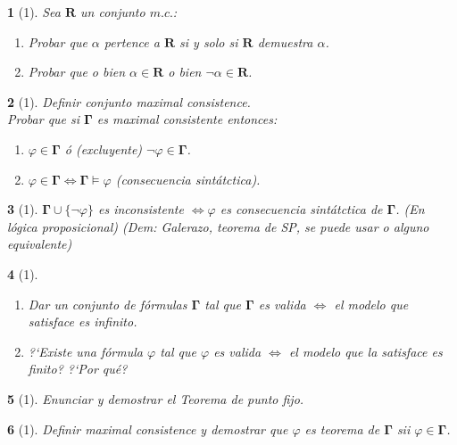 \documentclass[leqno, 12pt, twoside,letterpaper]{book}
\theoremstyle{plain}
\newtheorem{ej}{}
\theoremstyle{definition}
\newcommand{\bgamma}[0]{\bm{\Gamma}}
\newcommand{\sii}[0]{\Longleftrightarrow}
\newcommand{\union}[0]{\cup}
\begin{document}
\begin{ej}[1]
    Sea $\bm{R}$ un conjunto $m.c.$:
    \begin{enumerate}
        \item Probar que $\alpha$ pertence a $\bm{R}$ si y solo si $\bm{R}$
            demuestra $\alpha$.
        \item Probar que o bien $\alpha \in \bm{R}$ o bien $\lnot\alpha \in
            \bm{R}$.

    \end{enumerate}
\end{ej}

\begin{ej}[1]
    Definir conjunto maximal consistence. \\
    Probar que si $\bgamma$ es maximal consistente entonces:
    \begin{enumerate}
        \item $\varphi \in \bgamma$ ó (excluyente) $\lnot\varphi \in \bgamma$.
        \item $\varphi \in \bgamma \sii \bgamma \models \varphi$ (consecuencia
            sintátctica).
    \end{enumerate}

\end{ej}

\begin{ej}[1]
    $\bgamma \union \{ \lnot\varphi \}$ es inconsistente $\sii \varphi$ es
    consecuencia sintátctica de $\bgamma$. (En lógica proposicional) (Dem: Galerazo,
    teorema de SP, se puede usar o alguno equivalente)
\end{ej}

\begin{ej}[1]
    \begin{enumerate}
    \item Dar un conjunto de fórmulas $\bgamma$ tal que $\bgamma$ es valida $\sii$ el
    modelo que satisface es infinito.
    \item ?`Existe una fórmula $\varphi$ tal que
    $\varphi$ es valida $\sii$ el modelo que la satisface es finito? ?`Por qué?
    \end{enumerate}
\end{ej}

\begin{ej}[1]
    Enunciar y demostrar el Teorema de punto fijo.
\end{ej}


\begin{ej}[1]
    Definir maximal consistence y demostrar que $\varphi$ es teorema de
    $\bgamma$ sii $\varphi \in \bgamma$.
\end{ej}
\end{document}
